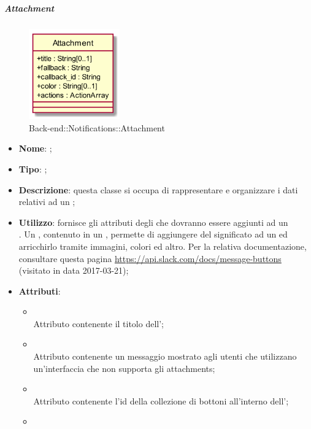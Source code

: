 \hypertarget{Attachment_label}{\subparagraph{Attachment}}
\begin{figure}[h]
	\centering
	\includegraphics[width=0.35\textwidth,height=\textheight,keepaspectratio]{images/ClassAttachment.png}
	\caption{Back-end::Notifications::Attachment}
\end{figure}
\begin{itemize}
	\item \textbf{Nome}: ;
	\item \textbf{Tipo}: ;
	\item \textbf{Descrizione}: questa classe si occupa di rappresentare e organizzare i dati relativi ad un 
;
	\item \textbf{Utilizzo}: fornisce gli attributi degli  che dovranno essere aggiunti ad un \\ .
Un , contenuto in un , permette di aggiungere del significato ad un  ed arricchirlo tramite immagini, colori ed altro.
Per la relativa documentazione, consultare questa pagina \url{https://api.slack.com/docs/message-buttons}  (visitato in data 2017-03-21);
	\item \textbf{Attributi}:
	\begin{itemize}
		\item[]  \\
		Attributo contenente il titolo dell';
		\item[]  \\
		Attributo contenente un messaggio mostrato agli utenti che utilizzano un'interfaccia che non supporta gli attachments;
		\item[]  \\
		Attributo contenente l'id della collezione di bottoni all'interno dell';
		\item[]  \\

\end{itemize}
\end{itemize}
